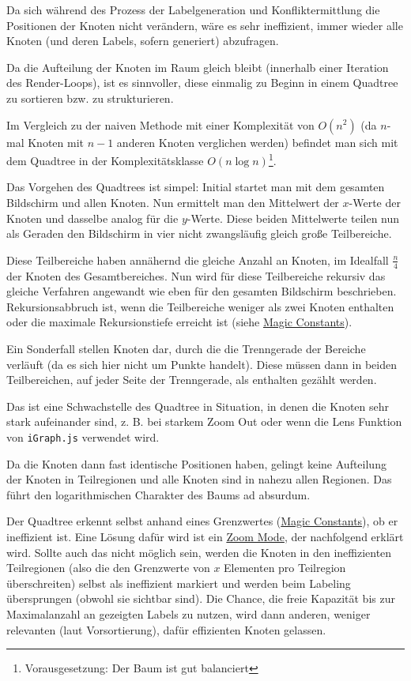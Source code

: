 
Da sich während des Prozess der Labelgeneration und Konfliktermittlung die Positionen der Knoten nicht verändern, wäre es sehr ineffizient,
immer wieder alle Knoten (und deren Labels, sofern generiert) abzufragen.

Da die Aufteilung der Knoten im Raum gleich bleibt (innerhalb einer Iteration des Render-Loops), ist es sinnvoller, diese einmalig zu Beginn
in einem Quadtree zu sortieren bzw. zu strukturieren.

Im Vergleich zu der naiven Methode mit einer Komplexität von $O(n^2)$ (da $n$-mal Knoten mit $n-1$ anderen Knoten verglichen werden) befindet man sich mit dem Quadtree in der Komplexitätsklasse
$O(n \log n)$\footnote{ Vorausgesetzung: Der Baum ist gut balanciert}\cite{quadtree}.

Das Vorgehen des Quadtrees ist simpel: Initial startet man mit dem gesamten Bildschirm und allen Knoten.
Nun ermittelt man den Mittelwert der $x$-Werte der Knoten und dasselbe analog für die $y$-Werte.
Diese beiden Mittelwerte teilen nun als Geraden den Bildschirm in vier nicht zwangsläufig gleich große Teilbereiche.

Diese Teilbereiche haben annähernd die gleiche Anzahl an Knoten, im Idealfall $\frac{n}{4}$ der Knoten des Gesamtbereiches.
Nun wird für diese Teilbereiche rekursiv das gleiche Verfahren angewandt wie eben für den gesamten Bildschirm beschrieben.
Rekursionsabbruch ist, wenn die Teilbereiche weniger als zwei Knoten enthalten oder die maximale Rekursionstiefe erreicht ist (siehe \hyperref[sec:consts]{Magic Constants}).

Ein Sonderfall stellen Knoten dar, durch die die Trenngerade der Bereiche verläuft (da es sich hier nicht um Punkte handelt).
Diese müssen dann in beiden Teilbereichen, auf jeder Seite der Trenngerade, als enthalten gezählt werden.

Das ist eine Schwachstelle des Quadtree in Situation, in denen die Knoten sehr stark aufeinander sind,
z. B. bei starkem Zoom Out oder wenn die Lens Funktion von \texttt{iGraph.js} verwendet wird.

Da die Knoten dann fast identische Positionen haben, gelingt keine Aufteilung der Knoten in Teilregionen und alle Knoten sind in nahezu allen Regionen.
Das führt den logarithmischen Charakter des Baums ad absurdum.

Der Quadtree erkennt selbst anhand eines Grenzwertes (\hyperref[sec:consts]{Magic Constants}), ob er ineffizient ist.
Eine Lösung dafür wird ist ein \hyperref[subsec:zoom]{Zoom Mode}, der nachfolgend erklärt wird.
Sollte auch das nicht möglich sein, werden die Knoten in den ineffizienten Teilregionen (also die den Grenzwerte von $x$ Elementen pro Teilregion überschreiten) selbst als ineffizient markiert
und werden beim Labeling übersprungen (obwohl sie sichtbar sind). Die Chance, die freie Kapazität bis zur Maximalanzahl an gezeigten Labels zu nutzen,
wird dann anderen, weniger relevanten (laut Vorsortierung), dafür effizienten Knoten gelassen.

